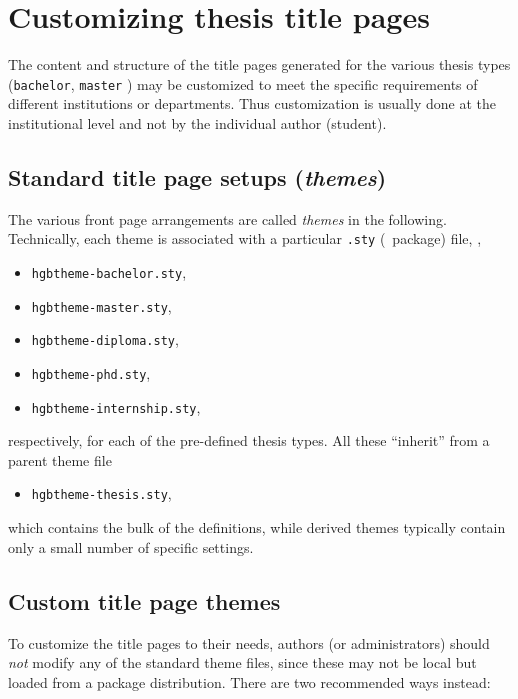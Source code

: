 \documentclass[english]{hgbarticle}
\begin{document}
\section{Customizing thesis title pages}

The content and structure of the title pages generated for the various thesis types
(\texttt{bachelor}, \texttt{master} \etc) may be customized to meet the specific
requirements of different institutions or departments.
Thus customization is usually done at the institutional level and not
by the individual author (student).

\subsection{Standard title page setups (\emph{themes})}

The various front page arrangements are called \emph{themes} in the following.
Technically, each theme is associated with a particular \texttt{.sty} (\latex\ package) file, \ie,  
\begin{itemize}
  \item[] \texttt{hgbtheme-bachelor.sty},
  \item[] \texttt{hgbtheme-master.sty},
  \item[] \texttt{hgbtheme-diploma.sty},
  \item[] \texttt{hgbtheme-phd.sty},
  \item[] \texttt{hgbtheme-internship.sty},
\end{itemize}
%
respectively, for each of the pre-defined thesis types.
All these ``inherit'' from a parent theme file
%
\begin{itemize}
  \item[] \texttt{hgbtheme-thesis.sty},
\end{itemize}
%
which contains the bulk of the definitions, while derived themes typically contain only 
a small number of specific settings.


\subsection{Custom title page themes}

To customize the title pages to their needs, authors (or administrators) should 
\emph{not} modify any of the standard theme files, since these may not be local but loaded
from a package distribution.
There are two recommended ways instead:
\end{document}
